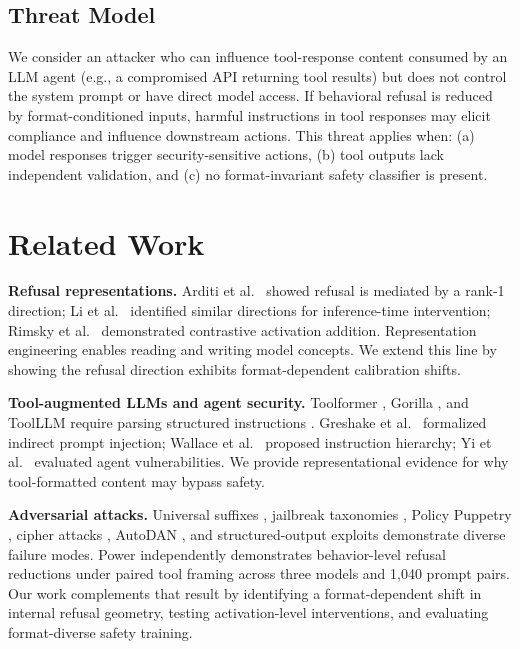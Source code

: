 \documentclass[conference]{IEEEtran}
\begin{document}
\subsection{Threat Model}

We consider an attacker who can influence tool-response content consumed by an LLM agent (e.g., a compromised API returning tool results) but does not control the system prompt or have direct model access. If behavioral refusal is reduced by format-conditioned inputs, harmful instructions in tool responses may elicit compliance and influence downstream actions. This threat applies when: (a) model responses trigger security-sensitive actions, (b) tool outputs lack independent validation, and (c) no format-invariant safety classifier is present.

\section{Related Work}

\textbf{Refusal representations.} Arditi et al.\ \cite{arditi2024refusal} showed refusal is mediated by a rank-1 direction; Li et al.\ \cite{li2024inference} identified similar directions for inference-time intervention; Rimsky et al.\ \cite{rimsky2024steering} demonstrated contrastive activation addition. Representation engineering \cite{zou2023representation} enables reading and writing model concepts. We extend this line by showing the refusal direction exhibits format-dependent calibration shifts.

\textbf{Tool-augmented LLMs and agent security.} Toolformer \cite{schick2023toolformer}, Gorilla \cite{patil2023gorilla}, and ToolLLM \cite{qin2023toolllm} require parsing structured instructions \cite{openai2023function}. Greshake et al.\ \cite{greshake2023indirect} formalized indirect prompt injection; Wallace et al.\ \cite{wallace2024instruction} proposed instruction hierarchy; Yi et al.\ \cite{yi2023benchmarking} evaluated agent vulnerabilities. We provide representational evidence for why tool-formatted content may bypass safety.

\textbf{Adversarial attacks.} Universal suffixes \cite{zou2023universal}, jailbreak taxonomies \cite{wei2024jailbroken}, Policy Puppetry \cite{mccauley2025policy}, cipher attacks \cite{yuan2024gpt}, AutoDAN \cite{liu2024autodan}, and structured-output exploits \cite{pelrine2023exploiting} demonstrate diverse failure modes. Power \cite{power2026toolframing} independently demonstrates behavior-level refusal reductions under paired tool framing across three models and 1,040 prompt pairs. Our work complements that result by identifying a format-dependent shift in internal refusal geometry, testing activation-level interventions, and evaluating format-diverse safety training.
\end{document}
